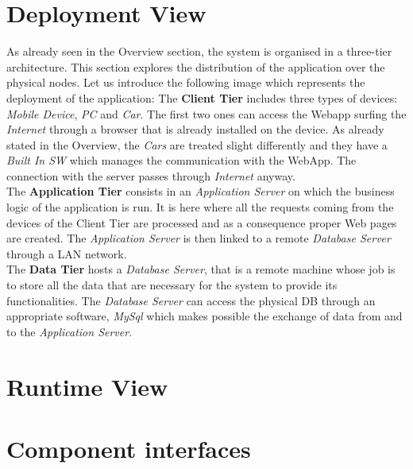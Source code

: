 \documentclass[11pt,a4paper]{report}
\begin{document}
\section{Deployment View}
As already seen in the Overview section, the system is organised in a three-tier architecture. This section explores the distribution of the application over the physical nodes. Let us introduce the following image which represents the deployment of the application:
\noindent The \textbf{Client Tier} includes three types of devices: \textit{Mobile Device}, \textit{PC} and \textit{Car}. The first two ones can access the Webapp surfing the \textit{Internet} through a browser that is already installed on the device.
As already stated in the Overview, the \textit{Cars} are treated slight differently and they have a \textit{Built In SW} which manages the communication with the WebApp. The connection with the server passes through \textit{Internet} anyway.\\
The \textbf{Application Tier} consists in an \textit{Application Server} on which the business logic of the application is run. It is here where all the requests coming from the devices of the Client Tier
are processed and as a consequence proper Web pages are created. The \textit{Application Server} is then linked to a remote \textit{Database Server} through a LAN network.\\
The \textbf{Data Tier} hosts a \textit{Database Server}, that is a remote machine whose job is to store all the data that are necessary for the system to provide its functionalities. The \textit{Database Server} can access the physical DB through an appropriate software, \textit{MySql} which makes possible the exchange of data from and to the \textit{Application Server}.

\section{Runtime View}
\section{Component interfaces}
\end{document}
